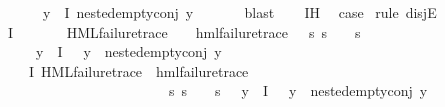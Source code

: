 \begin{isabellebody}
\ \ \ \ \ \ \ \ {\isacharparenleft}{\kern0pt}{\isasymforall}y{\isasymin}{\isasymPhi}\ {\isacharbackquote}{\kern0pt}\ I{\isachardot}{\kern0pt}\ nested{\isacharunderscore}{\kern0pt}empty{\isacharunderscore}{\kern0pt}conj\ y{\isacharparenright}{\kern0pt}{\isacharparenright}{\kern0pt}{\isachardoublequoteclose}\ \isanewline
\ \ \ \ \isamarkupfalse%
\ blast\isanewline
\ \ \isamarkupfalse%
\ IH\ \isamarkupfalse%
\ {\isacharquery}{\kern0pt}case\ \isamarkupfalse%
{\isacharparenleft}{\kern0pt}rule\ disjE{\isacharparenright}{\kern0pt}\isanewline
\ \ \ \ \isamarkupfalse%
\ {\isachardoublequoteopen}{\isasymexists}{\isasympsi}{\isasymin}{\isasymPhi}\ {\isacharbackquote}{\kern0pt}\ I{\isachardot}{\kern0pt}\isanewline
\ \ \ \ \ \ \ {\isacharparenleft}{\kern0pt}HML{\isacharunderscore}{\kern0pt}failure{\isacharunderscore}{\kern0pt}trace\ {\isasympsi}\ {\isasymand}\ {\isacharparenleft}{\kern0pt}{\isasymexists}{\isasympsi}{\isacharprime}{\kern0pt}{\isachardot}{\kern0pt}\ hml{\isacharunderscore}{\kern0pt}failure{\isacharunderscore}{\kern0pt}trace\ {\isasympsi}{\isacharprime}{\kern0pt}\ {\isasymand}\ {\isacharparenleft}{\kern0pt}{\isasymforall}s{\isachardot}{\kern0pt}\ {\isacharparenleft}{\kern0pt}s\ {\isasymTurnstile}\ {\isasympsi}{\isacharparenright}{\kern0pt}\ {\isacharequal}{\kern0pt}\ {\isacharparenleft}{\kern0pt}s\ {\isasymTurnstile}\ {\isasympsi}{\isacharprime}{\kern0pt}{\isacharparenright}{\kern0pt}{\isacharparenright}{\kern0pt}{\isacharparenright}{\kern0pt}{\isacharparenright}{\kern0pt}\ {\isasymand}\isanewline
\ \ \ \ \ \ \ {\isacharparenleft}{\kern0pt}{\isasymforall}y{\isasymin}{\isasymPhi}\ {\isacharbackquote}{\kern0pt}\ I{\isachardot}{\kern0pt}\ {\isasympsi}\ {\isasymnoteq}\ y\ {\isasymlongrightarrow}\ nested{\isacharunderscore}{\kern0pt}empty{\isacharunderscore}{\kern0pt}conj\ y{\isacharparenright}{\kern0pt}{\isachardoublequoteclose}\isanewline
\ \ \ \ \isamarkupfalse%
\ \isamarkupfalse%
\ {\isasymphi}\ {\isasympsi}\ \ {\isachardoublequoteopen}{\isasymphi}{\isasymin}{\isasymPhi}\ {\isacharbackquote}{\kern0pt}\ I{\isachardoublequoteclose}\ {\isachardoublequoteopen}HML{\isacharunderscore}{\kern0pt}failure{\isacharunderscore}{\kern0pt}trace\ {\isasymphi}{\isachardoublequoteclose}\ {\isachardoublequoteopen}hml{\isacharunderscore}{\kern0pt}failure{\isacharunderscore}{\kern0pt}trace\ {\isasympsi}{\isachardoublequoteclose}\ \isanewline
\ \ \ \ \ \ \ \ \ \ \ \ \ \ \ \ \ \ \ \ \ \ \ \ \ \ {\isachardoublequoteopen}{\isacharparenleft}{\kern0pt}{\isasymforall}s{\isachardot}{\kern0pt}\ {\isacharparenleft}{\kern0pt}s\ {\isasymTurnstile}\ {\isasymphi}{\isacharparenright}{\kern0pt}\ {\isacharequal}{\kern0pt}\ {\isacharparenleft}{\kern0pt}s\ {\isasymTurnstile}\ {\isasympsi}{\isacharparenright}{\kern0pt}{\isacharparenright}{\kern0pt}{\isachardoublequoteclose}\ {\isachardoublequoteopen}{\isacharparenleft}{\kern0pt}{\isasymforall}y{\isasymin}{\isasymPhi}\ {\isacharbackquote}{\kern0pt}\ I{\isachardot}{\kern0pt}\ {\isasymphi}\ {\isasymnoteq}\ y\ {\isasymlongrightarrow}\ nested{\isacharunderscore}{\kern0pt}empty{\isacharunderscore}{\kern0pt}conj\ y{\isacharparenright}{\kern0pt}{\isachardoublequoteclose}\isanewline

\end{isabellebody}
